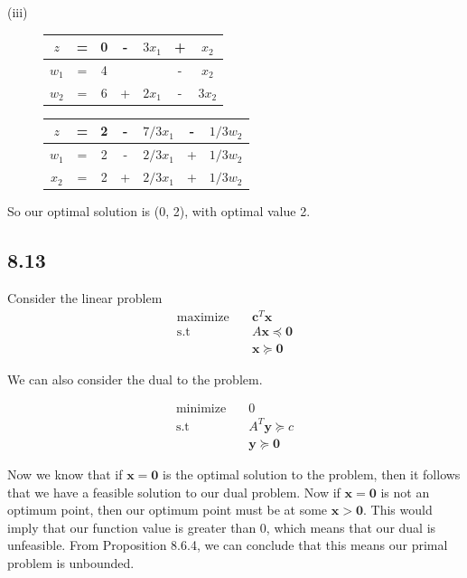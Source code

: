 \documentclass{article}
\begin{document}
	 (iii) 
	 
	 \begin{figure}[!h]
	 	\begin{tabular}{c c c c c c c}
	 		$z$ & = & 0 & - & $3x_1 $ & + & $x_2$ \\
	 		\hline
	 		$w_1$ & = & 4 & && - &$x_2$ \\
	 		$w_2$ & = & 6 & + & $2x_1 $ & - & $3x_2$ \\
	 		\hline
	 	\end{tabular}
	 \end{figure}	
	 
	 \begin{figure}[!h]
	 	\begin{tabular}{c c c c c c c}
	 		$z$ & = & 2 & - & $7/3 x_1 $ & - & $1/3 w_2$ \\
	 		\hline
	 		$w_1$ & = & 2 &- & $2/3 x_1$ & + &$1/3 w_2$ \\
	 		$x_2$ & = & 2 & + & $2/3 x_1$ & + & $1/3 w_2$ \\
	 		\hline
	 	\end{tabular}
	 \end{figure}	 
	 
	 So our optimal solution is (0, 2), with optimal value 2.
	 
	 \subsection*{8.13}
	 Consider the linear problem
	 \begin{align*}
	 \text{maximize} \quad &\mathbf{c}^T \mathbf{x} \\
	 \text{s.t} \quad &A \mathbf{x} \preceq \mathbf{0} \\
	 & \mathbf{x} \succeq \mathbf{0}
	 \end{align*}
	 
	 We can also consider the dual to the problem. 
	 
	 \begin{align*}
	 \text{minimize} \quad &0 \\
	 \text{s.t} \quad &A^T \mathbf{y} \succeq c\\
	 &\mathbf{y} \succeq \mathbf{0}
	 \end{align*}
	 
	 Now we know that if $\mathbf{x} = \mathbf{0}$ is the optimal solution to the problem, then it follows that we have a feasible solution to our dual problem. Now if $\mathbf{x} = \mathbf{0}$ is not an optimum point, then our optimum point must be at some $\mathbf{x} > \mathbf{0}$. This would imply that our function value is greater than 0, which means that our dual is unfeasible. From Proposition 8.6.4, we can conclude that this means our primal problem is unbounded. 
	 
\end{document}

